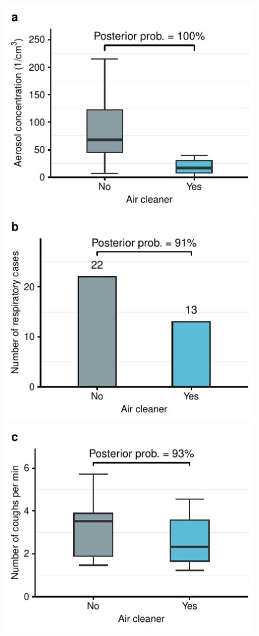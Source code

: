\documentclass[fleqn,11pt]{wlscirep}
\begin{document}
\begin{figure}[!htpb]
\centering
    \includegraphics{../../results/env-data/aerosol-number-boxplot.pdf}\hspace{.5cm}
    \includegraphics{../../results/epi-data/cases_by_condition.pdf}
    \includegraphics{../../results/cough-data/coughs-frequency-by-condition.pdf}\hspace{.5cm}

\end{figure}
\end{document}
